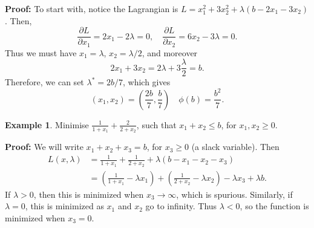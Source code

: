 \documentclass[12pt]{article}
\theoremstyle{definition}
\newtheorem{example}{Example}[section]
\theoremstyle{remark}
\begin{document}
\begin{adjustbox}{minipage = \columnwidth - 25.5pt, margin=1em, frame=1pt, margin=0em}
\textbf{Proof:} To start with, notice the Lagrangian is $L = x_1^2 + 3x_2^2 + \lambda(b - 2x_1 - 3x_2)$. Then,
\[
\frac{\partial L}{\partial x_1} = 2x_1 - 2 \lambda = 0, \quad \frac{\partial L}{\partial x_2} = 6x_2 - 3\lambda = 0
.\]
Thus we must have $x_1 = \lambda$, $x_2 = \lambda/2$, and moreover
\[
2x_1 + 3x_2 = 2\lambda + 3 \frac{\lambda}{2} = b
.\]
Therefore, we can set $\lambda^{\ast} = 2b/7$, which gives
\[
	(x_1, x_2) = \left( \frac{2b}{7} , \frac{b}{7} \right) \quad \phi(b) = \frac{b^2}{7}
.\]
\end{adjustbox}

\begin{example}
	Minimise $\displaystyle \frac{1}{1 + x_1} + \frac{2}{2 + x_2}$, such that $x_1 + x_2 \leq b$, for $x_1, x_2 \geq 0$.
\end{example}

\begin{adjustbox}{minipage = \columnwidth - 25.5pt, margin=1em, frame=1pt, margin=0em}
	\textbf{Proof:} We will write $x_1 + x_2 + x_3 = b$, for $x_3 \geq 0$ (a slack variable). Then
	\begin{align*}
		L(x, \lambda) &= \frac{1}{1 + x_1} + \frac{1}{2 + x_2} + \lambda(b - x_1 - x_2 - x_3) \\
			      &= \left( \frac{1}{1 + x_1} - \lambda x_1 \right) + \left( \frac{1}{2 + x_2} - \lambda x_2 \right) - \lambda x_3 + \lambda b.
	\end{align*}
	If $\lambda > 0$, then this is minimized when $x_3 \to \infty$, which is spurious. Similarly, if $\lambda = 0$, this is minimized as $x_1$ and $x_2$ go to infinity. Thus $\lambda < 0$, so the function is minimized when $x_3 = 0$.
\end{adjustbox}
\end{document}
